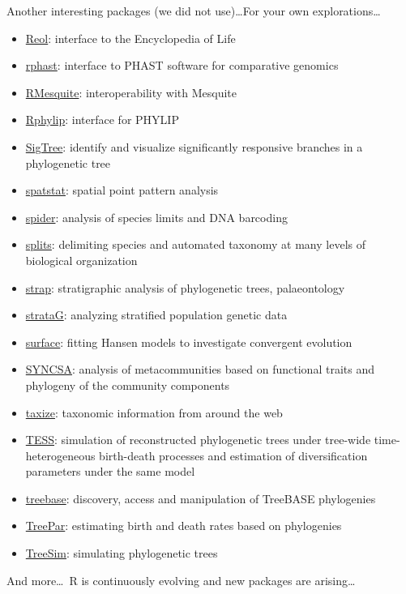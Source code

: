 \documentclass[compress, ucs, xelatex, 11pt, xcolor=svgnames,
  hyperref={
    bookmarks=true,
    unicode=true,
    colorlinks=true,
    pdftitle={Molecular data in R},
    plainpages=false,
    pdfauthor={Vojtech Zeisek},
    pdfsubject={Course about phylogeny and evolution in R},
    pdfcreator={XeLaTeX},
    pdfkeywords={R, evolution, phylogeny, molecular data},
    linkcolor=Tomato,
    anchorcolor=SaddleBrown,
    citecolor=Goldenrod,
    filecolor=DarkMagenta,
    menucolor=Sienna,
    urlcolor=DarkTurquoise,
    pdftex},
  url={hyphens, lowtilde} %
  ]{beamer}
\begin{document}
\begin{frame}[allowframebreaks]{Another interesting packages (we did not use)\ldots}{For your own explorations\ldots}
\begin{itemize}
    \item \href{https://cran.r-project.org/package=Reol}{Reol}: interface to the Encyclopedia of Life
    \item \href{https://cran.r-project.org/package=rphast}{rphast}: interface to PHAST software for comparative genomics
    \item \href{https://r-forge.r-project.org/projects/rmesquite/}{RMesquite}: interoperability with Mesquite
    \item \href{https://cran.r-project.org/package=Rphylip}{Rphylip}: interface for PHYLIP
    \item \href{https://cran.r-project.org/package=SigTree}{SigTree}: identify and visualize significantly responsive branches in a phylogenetic tree
    \item \href{https://cran.r-project.org/package=spatstat}{spatstat}: spatial point pattern analysis
    \item \href{https://cran.r-project.org/package=spider}{spider}: analysis of species limits and DNA barcoding
    \item \href{https://r-forge.r-project.org/projects/splits/}{splits}: delimiting species and automated taxonomy at many levels of biological organization
    \item \href{https://cran.r-project.org/package=strap}{strap}: stratigraphic analysis of phylogenetic trees, palaeontology
    \item \href{https://cran.r-project.org/package=strataG}{strataG}: analyzing stratified population genetic data
    \item \href{https://cran.r-project.org/package=surface}{surface}: fitting Hansen models to investigate convergent evolution
    \item \href{https://cran.r-project.org/package=SYNCSA}{SYNCSA}: analysis of metacommunities based on functional traits and phylogeny of the community components
    \item \href{https://cran.r-project.org/package=taxize}{taxize}: taxonomic information from around the web
    \item \href{https://cran.r-project.org/package=TESS}{TESS}: simulation of reconstructed phylogenetic trees under tree-wide time-heterogeneous birth-death processes and estimation of diversification parameters under the same model
    \item \href{https://cran.r-project.org/package=treebase}{treebase}:  discovery, access and manipulation of TreeBASE phylogenies
    \item \href{https://cran.r-project.org/package=TreePar}{TreePar}: estimating birth and death rates based on phylogenies
    \item \href{https://cran.r-project.org/package=TreeSim}{TreeSim}: simulating phylogenetic trees
  \end{itemize}
  And more\ldots~R is continuously evolving and new packages are arising\ldots
\end{frame}
\end{document}
